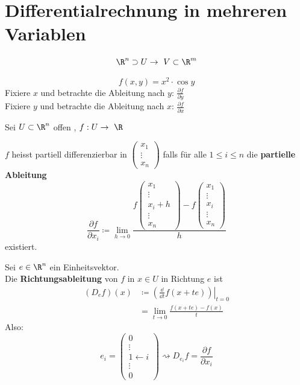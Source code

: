 \section{Differentialrechnung in mehreren Variablen}
\[ \R^n \supset U \rightarrow V \subset \R^m \]
\begin{bsp*}
	\[ f(x,y) = x^2 \cdot \cos y \]
	Fixiere $x$ und betrachte die Ableitung nach $y$: $\frac{\partial f}{\partial y}$ \\
	Fixiere $y$ und betrachte die Ableitung nach $x$: $\frac{\partial f}{\partial x}$
\end{bsp*}
Sei $U \subset \R^n$ offen , $f: U \rightarrow \R$ \\
\begin{def*}[note = partielle Differenzierbarkeit , index = partiel differenzierbar , indexformat = {2!1~}]
	$f$ heisst partiell differenzierbar in $\begin{pmatrix} x_1 \\ \vdots \\ x_n \end{pmatrix}$ falls für alle $1 \leq i \leq n$ die \textbf{partielle Ableitung}
	\[ \frac{\partial f}{\partial x_i} \coloneqq \lim_{h \rightarrow 0} \frac{f\begin{pmatrix} x_1 \\ \vdots \\ x_i + h \\ \vdots \\ x_n \end{pmatrix} - f\begin{pmatrix} x_1 \\ \vdots \\ x_i \\ \vdots \\ x_n \end{pmatrix}}{h} \]
	existiert.
\end{def*}
\begin{def*}[note = Richtungsableitung , index = Richtungs Ableitung , indexformat = {2!1-~}]
	Sei $e \in \R^n$ ein Einheitsvektor. \\
	Die \textbf{Richtungsableitung} von $f$ in $x \in U$ in Richtung $e$ ist
	\[ \begin{split}
		(D_e f)(x)	&\coloneqq \left.\left( \frac{\dd}{\dd t} f(x + te) \right)\right|_{t=0} \\
				&= \lim_{t \rightarrow 0} \frac{f(x+te) - f(x)}{t}
	\end{split} \]
	Also:
	\[ e_i = \begin{pmatrix} 0 \\ \vdots \\ 1 \leftarrow i \\ \vdots \\ 0 \end{pmatrix} \rightsquigarrow D_{e_i} f = \frac{\partial f}{\partial x_i} \]
\end{def*}
